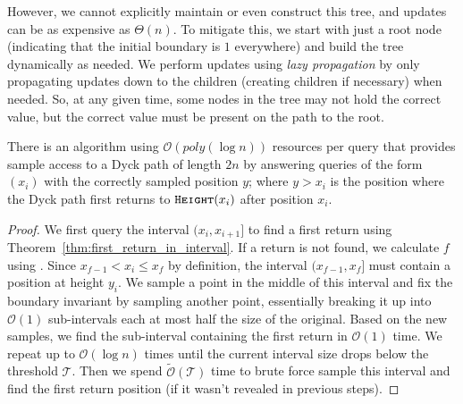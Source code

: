 However, we cannot explicitly maintain or even construct this tree, and updates can be as expensive as $\Theta(n)$.
To mitigate this, we start with just a root node (indicating that the initial boundary is $1$ everywhere) and build the tree dynamically as needed.
We perform updates using \emph{lazy propagation}  by only propagating updates down to the children (creating children if necessary) when needed.
So, at any given time, some nodes in the tree may not hold the correct value, but the correct value must be present on the path to the root.

\begin{theorem}
\label{thm:dyck_first_return_sampling}
There is an algorithm using $\mathcal O(poly(\log n))$ resources per query that provides sample access to a Dyck path of length $2n$
by answering queries of the form $(x_i)$ with the correctly sampled position $y$;
where $y>x_i$ is the position where the Dyck path first returns to $\texttt{\textsc{Height}}(x_i)$ after position $x_i$.
\end{theorem}
\begin{proof}
We first query the interval $(x_i,x_{i+1}]$ to find a first return using Theorem~\ref{thm:first_return_in_interval}.
If a return is not found, we calculate $f$ using .
Since $x_{f-1}<x_i\le x_f$ by definition, the interval $(x_{f-1},x_f]$ must contain a position at height $y_i$.
We sample a point in the middle of this interval and fix the boundary invariant by sampling another point,
essentially breaking it up into $\mathcal O(1)$ sub-intervals each at most half the size of the original.
Based on the new samples, we find the sub-interval containing the first return in $\mathcal O(1)$ time.
We repeat up to $\mathcal O(\log n)$ times until the current interval size drops below the threshold $\mathcal T$.
Then we spend $\tilde{\mathcal O}(\mathcal T)$ time to brute force sample this interval and find the first return position (if it wasn't revealed in previous steps).
\end{proof}
